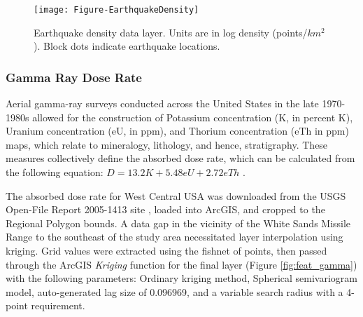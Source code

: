 \begin{figure}[!htp]
\centering
\texttt{[image: Figure-EarthquakeDensity]}
\caption[Earthquake density data layer]{Earthquake density data layer. Units are in log density (points/\(km^2\)). Block dots indicate earthquake locations.}
\label{fig:feat_EQ_density}
\end{figure}

\subsubsection{Gamma Ray Dose Rate}

Aerial gamma-ray surveys conducted across the United States in the late 1970-1980s allowed for the construction of Potassium concentration (K, in percent K), Uranium concentration (eU, in ppm), and Thorium concentration (eTh in ppm) maps, which relate to mineralogy, lithology, and hence, stratigraphy. These measures collectively define the absorbed dose rate, which can be calculated from the following equation: \( D = 13.2 K + 5.48 eU + 2.72 eTh \) \citep{duval_terrestrial_2005}.

The absorbed dose rate for West Central USA was downloaded from the USGS Open-File Report 2005-1413 site \citep{duval_terrestrial_2005}, loaded into ArcGIS, and cropped to the Regional Polygon bounds. A data gap in the vicinity of the White Sands Missile Range to the southeast of the study area necessitated layer interpolation using kriging. Grid values were extracted using the fishnet of points, then passed through the ArcGIS \textit{Kriging} function for the final layer (Figure \ref{fig:feat_gamma}) with the following parameters: Ordinary kriging method, Spherical semivariogram model, auto-generated lag size of 0.096969, and a variable search radius with a 4-point requirement.

